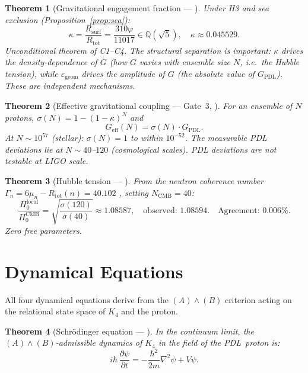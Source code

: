 \documentclass[12pt,a4paper]{article}
\theoremstyle{plain}
\newtheorem{theorem}{Theorem}[section]
\theoremstyle{definition}
\theoremstyle{remark}
\newcommand{\PDL}{\textsc{PDL}}
\newcommand{\Kfour}{K_4}
\newcommand{\vp}{\varphi}
\newcommand{\kap}{\kappa}
\newcommand{\sig}[1]{\sigma(#1)}
\newcommand{\sigmaN}{\sigma(N)}
\newcommand{\GPDL}{G_{\mathrm{PDL}}}
\newcommand{\Geff}{G_{\mathrm{eff}}}
\newcommand{\Rtot}{R_{\mathrm{tot}}}
\newcommand{\Rsurf}{R_{\mathrm{surf}}}
\newcommand{\egeom}{\varepsilon_{\mathrm{geom}}}
\begin{document}
\begin{theorem}[Gravitational engagement fraction --- \citep{D39,D42}]
\label{thm:kappa}
Under H3 and sea exclusion (Proposition~\ref{prop:sea}):
\[
\kap = \frac{\Rsurf}{\Rtot} = \frac{310\vp}{11017}\in\mathbb{Q}(\sqrt{5}),\quad\kap\approx 0.045529.
\]
Unconditional theorem of C1--C4. The structural separation is important: $\kap$ drives the \emph{density-dependence} of $G$ (how $G$ varies with ensemble size $N$, i.e.\ the Hubble tension), while $\egeom$ drives the \emph{amplitude} of $G$ (the absolute value of $G_{\mathrm{PDL}}$). These are independent mechanisms.
\end{theorem}

\begin{theorem}[Effective gravitational coupling --- Gate~3, \citep{D31,D36}]
\label{thm:Geff}
For an ensemble of $N$ protons, $\sigmaN=1-(1-\kap)^N$ and
\[
\Geff(N) = \sigmaN\cdot\GPDL.
\]
At $N\sim 10^{57}$ (stellar): $\sigmaN=1$ to within $10^{-52}$. The measurable PDL deviations lie at $N\sim 40$--$120$ (cosmological scales). PDL deviations are \emph{not} testable at LIGO scale.
\end{theorem}

\begin{theorem}[Hubble tension --- \citep{D24,D26,D27,D35}]
\label{thm:hubble}
From the neutron coherence number $\Gamma_n=6\mu_n-R_{\mathrm{tot}}(n)=40.102$ \citep{D27}, setting $N_{\mathrm{CMB}}=40$:
\[
\frac{H_0^{\mathrm{local}}}{H_0^{\mathrm{CMB}}} = \sqrt{\frac{\sig{120}}{\sig{40}}}\approx 1.08587,\quad\text{observed: }1.08594.\quad\text{Agreement: }0.006\%.
\]
Zero free parameters.
\end{theorem}

\section{Dynamical Equations}
\label{sec:dynamics}

All four dynamical equations derive from the $(A)\wedge(B)$ criterion acting on the relational state space of $\Kfour$ and the proton.

\begin{theorem}[Schrödinger equation --- \citep{D32}]
\label{thm:schrodinger}
In the continuum limit, the $(A)\wedge(B)$-admissible dynamics of $\Kfour$ in the field of the \PDL\ proton is:
\[
i\hbar\,\frac{\partial\psi}{\partial t} = -\frac{\hbar^2}{2m}\nabla^2\psi + V\psi.
\]
\end{theorem}
\end{document}
